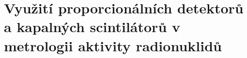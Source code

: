 \section[MVyužití detektorů v metrologii aktivity]{Využití proporcionálních detektorů a kapalných scintilátorů v metrologii aktivity radionuklidů}

